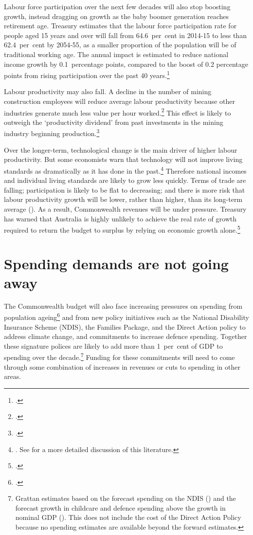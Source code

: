 \documentclass[twoside,english]{palatinob5portrait}
\begin{document}
Labour force participation over the next few decades will also stop boosting growth, instead dragging on growth as the baby boomer generation reaches retirement age. Treasury estimates that the labour force participation rate for people aged 15 years and over will fall from 64.6~per~cent in 2014-15 to less than 62.4~per~cent by 2054-55, as a smaller proportion of the population will be of traditional working age.  The annual impact is estimated to reduce national income growth by 0.1~percentage points, compared to the boost of 0.2 percentage points from rising participation over the past 40 years.\footcite[][pp.~ix,xi]{Hockey2015IGR}  

Labour productivity may also fall. A decline in the number of mining construction employees will reduce average labour productivity because other industries generate much less value per hour worked.\footcite{Borland2014}  This effect is likely to outweigh the ‘productivity dividend’ from past investments in the mining industry beginning production.\footcite[][12]{Commission2014} 

Over the longer-term, technological change is the main driver of higher labour productivity. But some economists warn that technology will not improve living standards as dramatically as it has done in the past.\footnote{\textcites{Gordon2012}{Cowen2011}. See \textcites{DaleyWoodWeidmannEtAl2014}{Dolamore2015} for a more detailed discussion of this literature.}  Therefore national incomes and individual living standards are likely to grow less quickly. Terms of trade are falling; participation is likely to be flat to decreasing; and there is more risk that labour productivity growth will be lower, rather than higher, than its long-term average (). As a result, Commonwealth revenues will be under pressure. Treasury has warned that Australia is highly unlikely to achieve the real rate of growth required to return the budget to surplus by relying on economic growth alone.\footcite{Parkinson2014}  

\section{Spending demands are not going away\label{sec:FISCAL-3-2}}
The Commonwealth budget will also face increasing pressures on spending from population ageing\footcite{Hockey2015IGR}  and from new policy initiatives such as the National Disability Insurance Scheme (NDIS), the Families Package, and the Direct Action policy to address climate change, and commitments to increase defence spending. Together these signature polices are likely to add more than 1~per~cent of GDP to spending over the decade.\footnote{Grattan estimates based on the forecast spending on the NDIS (\textcite{Commission2014})
and the forecast growth in childcare and defence spending above the growth in nominal GDP (\textcite{NationalCommissionAudit2014}). This does not include the cost of the Direct Action Policy because no spending estimates are available beyond the forward estimates. 
}  Funding for these commitments will need to come through some combination of increases in revenues or cuts to spending in other areas. 
\end{document}
